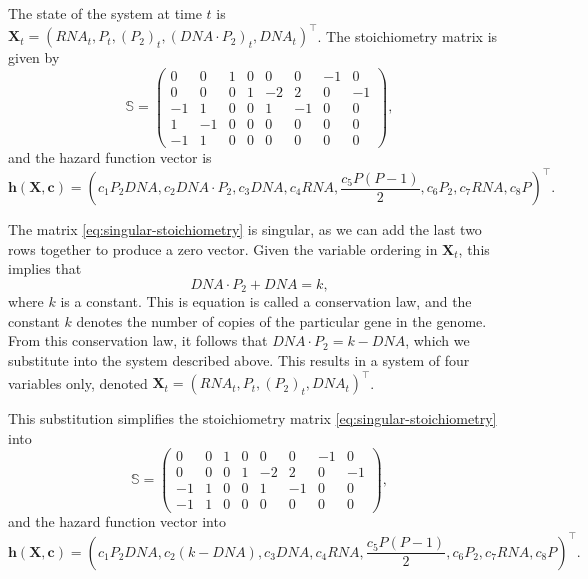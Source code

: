 The state of the system at time $t$ is $\bm{X}_t = \left(\mathit{RNA}_t, P_t, (P_2)_t, (\mathit{DNA} \cdot P_2)_t, \mathit{DNA}_t\right)^\intercal$. The stoichiometry matrix is given by
\begin{equation} \label{eq:singular-stoichiometry}
\mathbb{S} = \begin{pmatrix}
0 & 0 & 1 & 0 & 0 & 0 & -1 & 0 \\
0 & 0 & 0 & 1 & -2 & 2 & 0 & -1 \\
-1 & 1 & 0 & 0 & 1 & -1 & 0 & 0 \\
1 & -1 & 0 & 0 & 0 & 0 & 0 & 0 \\
-1 & 1 & 0 & 0 & 0 & 0 & 0 & 0
\end{pmatrix},
\end{equation}
and the hazard function vector is \citep{wilkinson}
\begin{equation*}
\bm{h}(\bm{X}, \bm{c}) = \left(c_1 P_2 \mathit{DNA}, c_2 \mathit{DNA} \cdot P_2, c_3 \mathit{DNA}, c_4 \mathit{RNA}, \frac{c_5 P(P-1)}{2}, c_6 P_2, c_7 \mathit{RNA}, c_8 P \right)^\intercal.
\end{equation*}

The matrix \eqref{eq:singular-stoichiometry} is singular, as we can add the last two rows together to produce a zero vector. Given the variable ordering in $\bm{X}_t$, this implies that
\begin{equation*}
\mathit{DNA} \cdot P_2 + \mathit{DNA} = k,
\end{equation*}
where $k$ is a constant. This is equation is called a conservation law, and the constant $k$ denotes the number of copies of the particular gene in the genome. From this conservation law, it follows that $\mathit{DNA} \cdot P_2 = k - \mathit{DNA}$, which we substitute into the system described above. This results in a system of four variables only, denoted ${\bm{X}_t = \left(\mathit{RNA}_t, P_t, (P_2)_t, \mathit{DNA}_t\right)^\intercal}$.

This substitution simplifies the stoichiometry matrix \eqref{eq:singular-stoichiometry} into
\begin{equation*}
\mathbb{S} = \begin{pmatrix}
0 & 0 & 1 & 0 & 0 & 0 & -1 & 0 \\
0 & 0 & 0 & 1 & -2 & 2 & 0 & -1 \\
-1 & 1 & 0 & 0 & 1 & -1 & 0 & 0 \\
-1 & 1 & 0 & 0 & 0 & 0 & 0 & 0
\end{pmatrix},
\end{equation*}
and the hazard function vector into
\begin{equation*}
\bm{h}(\bm{X}, \bm{c}) = \left(c_1 P_2 \mathit{DNA}, c_2 (k - \mathit{DNA}), c_3 \mathit{DNA}, c_4 \mathit{RNA}, \frac{c_5 P(P-1)}{2}, c_6 P_2, c_7 \mathit{RNA}, c_8 P \right)^\intercal.
\end{equation*}

